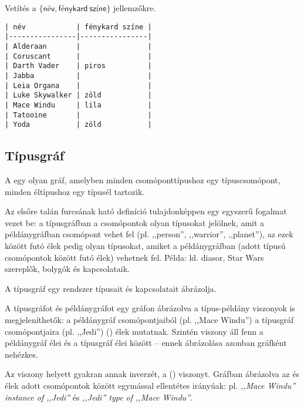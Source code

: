 Vetítés a $\{\mathsf{név, fénykard\: színe\}}$ jellemzőkre.

\begin{verbatim}
| név            | fénykard színe |
|----------------|----------------|
| Alderaan       |                |
| Coruscant      |                |
| Darth Vader    | piros          |
| Jabba          |                |
| Leia Organa    |                |
| Luke Skywalker | zöld           |
| Mace Windu     | lila           |
| Tatooine       |                |
| Yoda           | zöld           |
\end{verbatim}

\subsection{Típusgráf}

\begin{definicio}
A  egy olyan gráf, amelyben minden csomóponttípushoz egy típuscsomópont, minden éltípushoz egy típusél tartozik.
\end{definicio}

Az elsőre talán furcsának ható definíció tulajdonképpen egy egyszerű fogalmat vezet be: a típusgráfban a csomópontok olyan típusokat jelölnek, amit a példánygráfban csomópont vehet fel (pl. ,,person'', ,,warrior'', ,,planet''), az ezek között futó élek pedig olyan típusokat, amiket a példánygráfban (adott típusú csomópontok között futó élek) vehetnek fel. Példa: ld. diasor, Star Wars szereplők, bolygók és kapcsolataik.

A típusgráf egy rendszer  típusait és kapcsolatait ábrázolja.

A típusgráfot és példánygráfot egy gráfon ábrázolva a típus-példány viszonyok is megjeleníthetők: a példánygráf csomópontjaiból (pl. ,,Mace Windu'') a típusgráf csomópontjaira (pl. ,,Jedi'')  () élek mutatnak. Szintén  viszony áll fenn a példánygráf élei és a típusgráf élei között -- ennek ábrázolása azonban gráfként nehézkes.

Az  viszony helyett gyakran annak inverzét, a  () viszonyt. Gráfban ábrázolva az  és  élek adott csomópontok között egymással ellentétes irányúak: pl. \emph{,,Mace Windu'' instance of ,,Jedi''} és \emph{,,Jedi'' type of ,,Mace Windu''}.


